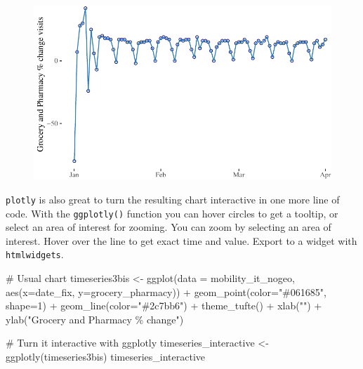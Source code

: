 \documentclass[
  letterpaper,
  DIV=11,
  numbers=noendperiod]{scrreprt}
\newenvironment{Shaded}{\begin{snugshade}}{\end{snugshade}}
\newcommand{\AttributeTok}[1]{\textcolor[rgb]{0.40,0.45,0.13}{#1}}
\newcommand{\CommentTok}[1]{\textcolor[rgb]{0.37,0.37,0.37}{#1}}
\newcommand{\DecValTok}[1]{\textcolor[rgb]{0.68,0.00,0.00}{#1}}
\newcommand{\FunctionTok}[1]{\textcolor[rgb]{0.28,0.35,0.67}{#1}}
\newcommand{\NormalTok}[1]{\textcolor[rgb]{0.00,0.23,0.31}{#1}}
\newcommand{\OtherTok}[1]{\textcolor[rgb]{0.00,0.23,0.31}{#1}}
\newcommand{\SpecialCharTok}[1]{\textcolor[rgb]{0.37,0.37,0.37}{#1}}
\newcommand{\StringTok}[1]{\textcolor[rgb]{0.13,0.47,0.30}{#1}}
\begin{document}
\begin{figure}[H]

{\centering \includegraphics{longitudinal-1_files/figure-pdf/unnamed-chunk-10-1.pdf}

}

\end{figure}

\texttt{plotly} is also great to turn the resulting chart interactive in
one more line of code. With the \texttt{ggplotly()} function you can
hover circles to get a tooltip, or select an area of interest for
zooming. You can zoom by selecting an area of interest. Hover over the
line to get exact time and value. Export to a widget with
\texttt{htmlwidgets}.

\begin{Shaded}
\begin{Highlighting}[]
\CommentTok{\# Usual chart}
\NormalTok{timeseries3bis }\OtherTok{\textless{}{-}} \FunctionTok{ggplot}\NormalTok{(}\AttributeTok{data =}\NormalTok{ mobility\_it\_nogeo, }\FunctionTok{aes}\NormalTok{(}\AttributeTok{x=}\NormalTok{date\_fix, }\AttributeTok{y=}\NormalTok{grocery\_pharmacy)) }\SpecialCharTok{+}
  \FunctionTok{geom\_point}\NormalTok{(}\AttributeTok{color=}\StringTok{"\#061685"}\NormalTok{, }\AttributeTok{shape=}\DecValTok{1}\NormalTok{) }\SpecialCharTok{+}
  \FunctionTok{geom\_line}\NormalTok{(}\AttributeTok{color=}\StringTok{"\#2c7bb6"}\NormalTok{) }\SpecialCharTok{+} 
  \FunctionTok{theme\_tufte}\NormalTok{() }\SpecialCharTok{+}
  \FunctionTok{xlab}\NormalTok{(}\StringTok{""}\NormalTok{) }\SpecialCharTok{+}
  \FunctionTok{ylab}\NormalTok{(}\StringTok{"Grocery and Pharmacy \% change"}\NormalTok{) }

\CommentTok{\# Turn it interactive with ggplotly}
\NormalTok{timeseries\_interactive }\OtherTok{\textless{}{-}} \FunctionTok{ggplotly}\NormalTok{(timeseries3bis)}
\NormalTok{timeseries\_interactive}
\end{Highlighting}
\end{Shaded}
\end{document}
